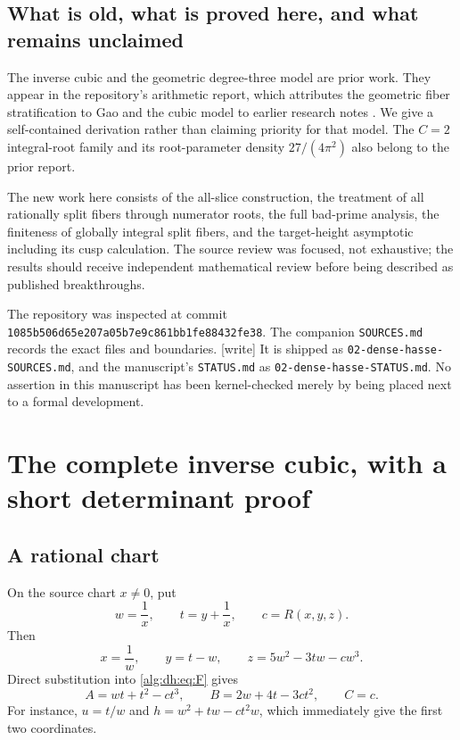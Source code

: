 \documentclass[11pt]{article}
\numberwithin{equation}{section}
\theoremstyle{plain}
\theoremstyle{plain}
\theoremstyle{plain}
\theoremstyle{definition}
\theoremstyle{definition}
\theoremstyle{definition}
\theoremstyle{remark}
\newcommand{\wtag}{\textup{[write]}}%
\newcommand{\rpath}[1]{\nolinkurl{#1}}
\newcommand{\dhsha}{\nolinkurl{1085b506d65e207a05b7e9c861bb1fe88432fe38}}
\begin{document}
\subsection{What is old, what is proved here, and what remains unclaimed}
The inverse cubic and the geometric degree-three model are prior work.
They appear in the repository's arithmetic report, which attributes the
geometric fiber stratification to Gao and the cubic model to earlier
research notes \cite{dh:priorreport,gao}. We give a self-contained derivation
rather than claiming priority for that model. The $C=2$ integral-root
family and its root-parameter density $27/(4\pi^2)$ also belong to the
prior report.

The new work here consists of the all-slice construction, the treatment
of all rationally split fibers through numerator roots, the full
bad-prime analysis, the finiteness of globally integral split fibers,
and the target-height asymptotic including its cusp calculation.
The source review was focused, not exhaustive; the results should receive
independent mathematical review before being described as published
breakthroughs.

The repository was inspected at commit \dhsha.
The companion \rpath{SOURCES.md} records the exact files and boundaries.
\wtag{} It is shipped as \rpath{02-dense-hasse-SOURCES.md}, and the
manuscript's \texttt{STATUS.md} as \rpath{02-dense-hasse-STATUS.md}.
No assertion in this manuscript has been kernel-checked merely by being
placed next to a formal development.

\section{The complete inverse cubic, with a short determinant proof}\label{alg:dh:sec:inverse}

\subsection{A rational chart}
On the source chart $x\ne0$, put
\begin{equation}\label{alg:dh:eq:chart}
 w=\frac1x,\qquad t=y+\frac1x,\qquad c=R(x,y,z).
\end{equation}
Then
\begin{equation}\label{alg:dh:eq:source-chart}
 x=\frac1w,\qquad y=t-w,\qquad z=5w^2-3tw-cw^3.
\end{equation}
Direct substitution into \eqref{alg:dh:eq:F} gives
\begin{equation}\label{alg:dh:eq:target-chart}
 A=wt+t^2-ct^3,\qquad B=2w+4t-3ct^2,\qquad C=c.
\end{equation}
For instance, $u=t/w$ and $h=w^2+tw-ct^2w$, which immediately give
the first two coordinates.
\end{document}
